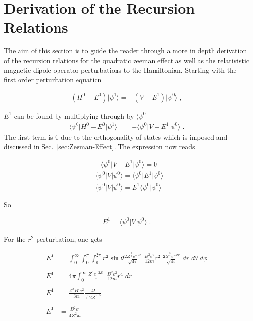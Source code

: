 \chapter{Derivation of the Recursion Relations}
    The aim of this section is to guide the reader through a more in depth derivation of the recursion relations for the quadratic zeeman effect as well as the relativistic magnetic dipole operator perturbations to the Hamiltonian. Starting with the first order perturbation equation

    \begin{align}
        \left(H^0 - E^0 \right) \vert \psi^1 \rangle = -\left( V - E^1  \right) \vert \psi^0 \rangle\;,
    \end{align}

    \noindent $E^1$ can be found by multiplying through by $\langle \psi^0 \vert$
    \begin{align}
        \langle \psi^0 \vert H^0 - E^0 \vert \psi^1 \rangle &= -\langle \psi^0 \vert V - E^1 \vert \psi^0 \rangle \;.
    \end{align}
    \noindent The first term is $0$ due to the orthogonality of states which is imposed and discussed in Sec.~\ref{sec:Zeeman-Effect}. The expression now reads 

    \begin{align*}
        &-\langle \psi^0 \vert V - E^1 \vert \psi^0 \rangle = 0 \\
        &\langle \psi^0 \vert V \vert \psi^0 \rangle =  \langle \psi^0 \vert E^1 \vert \psi^0 \rangle\\
        &\langle \psi^0 \vert V \vert \psi^0 \rangle =  E^1 \langle \psi^0 \vert \psi^0 \rangle
    \end{align*}

    \noindent So 

    \begin{align}
        E^1 = \langle \psi^0 \vert V \vert \psi^0 \rangle\;.
    \end{align}

    \noindent For the $r^2$ perturbation, one gets 

    \begin{align*}
        E^1 &= \int^\infty_0\int_0^\pi  \int_0^{2\pi} r^2 \sin\theta \frac{2Z^{\frac{3}{2}} e^{-Zr}}{\sqrt{4\pi}} \; \frac{B^2e^2}{12m}r^2\;  \frac{2Z^{\frac{3}{2}} e^{-Zr}}{\sqrt{4\pi}} \;dr\; d\theta\; d\phi\\ \nonumber\\
        E^1 &= {4\pi} \int_0^\infty \frac{Z^3 e^{-2Zr}}{\pi} \; \frac{B^2e^2}{12m}r^4 \;dr\\ \nonumber\\
        E^1 &= \frac{Z^3 B^2 e^2}{3m} \frac{4!}{(2Z)^5} \\ \nonumber \\
        E^1 &= \frac{B^2 e^2}{4Z^2m}
    \end{align*}

